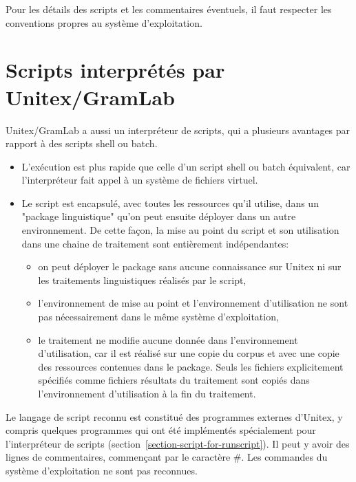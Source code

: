 \noindent Pour les détails des scripts et les commentaires éventuels, il faut respecter les conventions
propres au système d'exploitation.



\section{Scripts interprétés par Unitex/GramLab}
\label{section-unitex-scripts}

Unitex/GramLab a aussi un interpréteur de scripts, qui a plusieurs avantages par rapport à des scripts
shell ou batch.
\begin{itemize}
    \item L'exécution est plus rapide que celle d'un script shell ou batch équivalent, car l'interpréteur fait
appel à un système de fichiers virtuel.
    \item Le script est encapsulé, avec toutes les ressources qu'il utilise, dans un "package linguistique"
qu'on peut ensuite déployer dans un autre environnement. De cette façon, la mise au point du script
et son utilisation dans une chaine de traitement sont entièrement indépendantes:
\begin{itemize}
    \item on peut déployer le package sans aucune connaissance sur Unitex ni sur les traitements
linguistiques réalisés par le script,
    \item l'environnement de mise au point et l'environnement d'utilisation ne sont pas nécessairement
dans le même système d'exploitation,
    \item le traitement ne modifie aucune donnée dans l'environnement d'utilisation, car il est réalisé
sur une copie du corpus et avec une copie des ressources contenues dans le package. Seuls les fichiers
explicitement spécifiés comme fichiers résultats du traitement sont copiés dans l'environnement
d'utilisation à la fin du traitement.
\end{itemize}
\end{itemize}

\noindent Le langage de script reconnu est constitué des programmes externes d'Unitex, y compris
quelques programmes qui ont été implémentés spécialement pour l'interpréteur de scripts
(section~\ref{section-script-for-runscript}). Il peut y avoir des lignes de commentaires, commençant
par le caractère \#. Les commandes du système d'exploitation ne sont pas reconnues.

